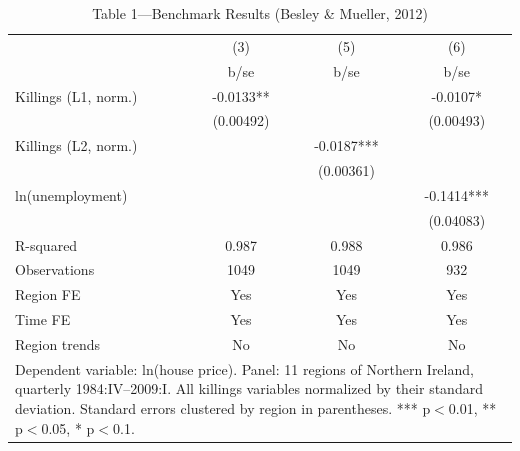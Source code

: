 \begin{table}[htbp]\centering
\def\sym#1{\ifmmode^{#1}\else\(^{#1}\)\fi}
\caption{Table 1---Benchmark Results (Besley \& Mueller, 2012)}
\begin{tabular}{l*{3}{c}}
\toprule
            &\multicolumn{1}{c}{(3)}&\multicolumn{1}{c}{(5)}&\multicolumn{1}{c}{(6)}\\
            &        b/se   &        b/se   &        b/se   \\
\midrule
Killings (L1, norm.)&     -0.0133** &               &     -0.0107*  \\
            &   (0.00492)   &               &   (0.00493)   \\
Killings (L2, norm.)&               &     -0.0187***&               \\
            &               &   (0.00361)   &               \\
ln(unemployment)&               &               &     -0.1414***\\
            &               &               &   (0.04083)   \\
\midrule
R-squared   &       0.987   &       0.988   &       0.986   \\
Observations&        1049   &        1049   &         932   \\
Region FE   &         Yes   &         Yes   &         Yes   \\
Time FE     &         Yes   &         Yes   &         Yes   \\
Region trends&          No   &          No   &          No   \\
\bottomrule
\multicolumn{4}{l}{\footnotesize Dependent variable: ln(house price).  Panel: 11 regions of Northern Ireland, quarterly 1984:IV--2009:I.  All killings variables normalized by their standard deviation.  Standard errors clustered by region in parentheses.  *** p$<$0.01, ** p$<$0.05, * p$<$0.1.}\\
\end{tabular}
\end{table}
